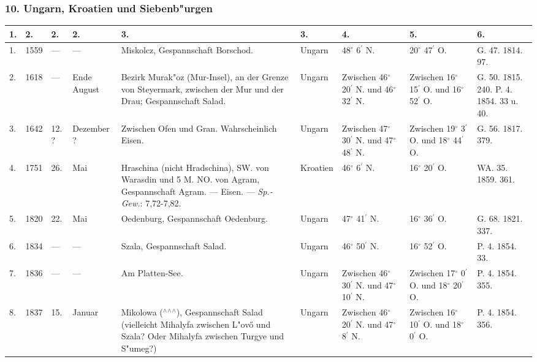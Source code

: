 \documentclass[a4paper, 8pt, oneside, polutonikogreek, german]{article}
\begin{document}
\subsubsection{10. Ungarn, Kroatien und Siebenb"urgen}
\begin{center}
    \footnotesize
    \begin{longtable}{|p{3mm}|p{6mm}|p{5mm}|p{16mm}|p{25mm}|p{20mm}|p{13mm}|p{13mm}|p{13mm}|}
    \hline
        1. & 2. & 2. & 2. & 3. & 3. & 4. & 5. & 6. \\ \hline
        1. & 1559 & --- & --- & Miskolcz, Gespannschaft Borschod. & Ungarn & 48$^\circ$ 6$^\prime$ N. & 20$^\circ$ 47$^\prime$ O. & G. 47. 1814. 97. \\ \hline
        2. & 1618 & --- & Ende August & Bezirk Murak"oz (Mur-Insel), an der Grenze von Steyermark, zwischen der Mur und der Drau; Gespannschaft Salad. & Ungarn & Zwischen 46$^\circ$ 20$^\prime$ N. und 46$^\circ$ 32$^\prime$ N. & Zwischen 16$^\circ$ 15$^\prime$ O. und 16$^\circ$ 52$^\prime$ O. & G. 50. 1815. 240. P. 4. 1854. 33 u. 40. \\ \hline
        3. & 1642 & 12. ? & Dezember ? & Zwischen Ofen und Gran. Wahrscheinlich Eisen. & Ungarn & Zwischen 47$^\circ$ 30$^\prime$ N. und 47$^\circ$ 48$^\prime$ N. & Zwischen 19$^\circ$ 3$^\prime$ O. und 18$^\circ$ 44$^\prime$ O. & G. 56. 1817. 379. \\ \hline
        4. & 1751 & 26. & Mai & Hraschina (nicht Hradschina), SW. von Warasdin und 5 M. NO. von Agram, Gespannschaft Agram. --- Eisen. --- \emph{Sp.-Gew.}: 7,72-7,82. & Kroatien & 46$^\circ$ 6$^\prime$ N. & 16$^\circ$ 20$^\prime$ O. & WA. 35. 1859. 361. \\ \hline
        5. & 1820 & 22. & Mai & Oedenburg, Gespannschaft Oedenburg. & Ungarn & 47$^\circ$ 41$^\prime$ N. & 16$^\circ$ 36$^\prime$ O. & G. 68. 1821. 337. \\ \hline
        6. & 1834 & --- & --- & Szala, Gespannschaft Salad. & Ungarn & 46$^\circ$ 50$^\prime$ N. & 16$^\circ$ 52$^\prime$ O. & P. 4. 1854. 33. \\ \hline
        7. & 1836 & --- & --- & Am Platten-See. & Ungarn & Zwischen 46$^\circ$ 30$^\prime$ N. und 47$^\circ$ 10$^\prime$ N. & Zwischen 17$^\circ$ 0$^\prime$ O. und 18$^\circ$ 20$^\prime$ O. & P. 4. 1854. 355. \\ \hline
        8. & 1837 & 15. & Januar & Mikolowa ($^\wedge$$^\wedge$$^\wedge$), Gespannschaft Salad (vielleicht Mihalyfa zwischen L"ovő und Szala? Oder Mihalyfa zwischen Turgye und S"umeg?) & Ungarn & Zwischen 46$^\circ$ 20$^\prime$ N. und 47$^\circ$ 8$^\prime$ N. & Zwischen 16$^\circ$ 10$^\prime$ O. und 18$^\circ$ 0$^\prime$ O. & P. 4. 1854. 356. \\ \hline

\end{longtable}
\end{center}
\end{document}
